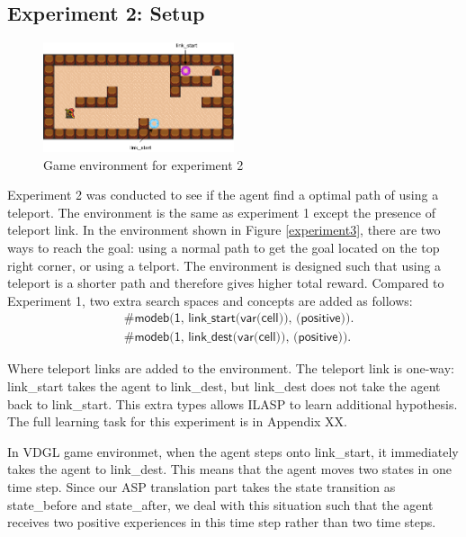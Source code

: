 \subsection{Experiment 2: Setup}
\label{subsec:experiement2_setup}
\begin{figure}[!htb]
\centering
\includegraphics[width=0.5\textwidth]{./figures/experiment2_setup}
\caption{Game environment for experiment 2}
\label{experiment2}
\end{figure}
Experiment 2 was conducted to see if the agent find a optimal path of using a teleport. The environment is the same as experiment 1 except the presence of teleport link.
In the environment shown in Figure \ref{experiment3},
there are two ways to reach the goal: using a normal path to get the goal located on the top right corner, or using a telport.
The environment is designed such that using a teleport is a shorter path and therefore gives higher total reward.
Compared to Experiment 1, two extra search spaces and concepts are added as follows:
\begin{equation*}
\begin{split}
&\textsf{\#modeb(1, link\_start(var(cell)), (positive)).}\\
&\textsf{\#modeb(1, link\_dest(var(cell)), (positive)).}
\end{split}
\end{equation*}

Where teleport links are added to the environment. The teleport link is one-way: \textsf{link\_start} takes the agent to \textsf{link\_dest}, but \textsf{link\_dest} does not take the agent back to \textsf{link\_start}.
This extra types allows ILASP to learn additional hypothesis.
The full learning task for this experiment is in Appendix XX.

In VDGL game environmet, when the agent steps onto \textsf{link\_start}, it immediately takes the agent to \textsf{link\_dest}. This means that the agent moves two states in one time step.
Since our ASP translation part takes the state transition as \textsf{state\_before} and \textsf{state\_after}, 
we deal with this situation such that the agent receives two positive experiences in this time step rather than two time steps.


